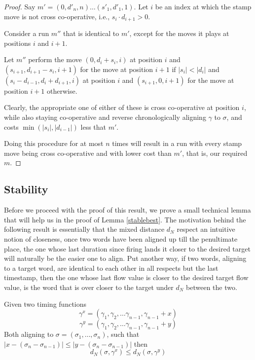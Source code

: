 \documentclass[runningheads]{llncs}
\begin{document}
\begin{proof}
Say $m' = (0, d'_n, n) \dots (s'_1, d'_1, 1)$. 
Let $i$ be an index at which the stamp move is not cross co-operative, i.e., $s_i \cdot d_{i+1} > 0$. 

Consider a run $m''$ that is identical to $m'$, except for the moves it plays at positions $i$ and $i+1$.   

Let $m''$ perform the move $(0, d_i + s_i, i)$ at position $i$ and $(s_{i+1}, d_{i+1} - s_{i}, i+1)$ for the move at position $i+1$ if $|s_i| < |d_i|$ and $(s_i - d_{i-1}, d_i + d_{i+1}, i)$ at position $i$ and $(s_{i+1}, 0, i+1)$ for the move at position $i+1$ otherwise. 

Clearly, the appropriate one of either of these is cross co-operative at position $i$, while also staying co-operative and reverse chronologically aligning $\gamma$ to $\sigma$, and costs $\min(|s_i|, |d_{i-1}|)$ less that $m'$. 

Doing this procedure for at most $n$ times will result in a run with every stamp move being cross co-operative and with lower cost than $m'$, that is, our required $m$. 
\end{proof}

\subsection{Stability} 
Before we proceed with the proof of this result, we prove a small technical lemma that will help us in the proof of Lemma \ref{stablebest}. The motivation behind the following result is essentially that the mixed distance $d_N$ respect an intuitive notion of closeness, once two words have been aligned up till the penultimate place, the one whose last duration since firing lands it closer to the desired target will naturally be the easier one to align. Put another way, if two words, aligning to a target word, are identical to each other in all respects but the last timestamp, then the one whose last flow value is closer to the desired target flow value, is the word that is over closer to the target under $d_N$ between the two. 

\begin{lemma}\label{cooplast}
Given two timing functions $$\gamma^x = (\gamma_1, \gamma_2, \dots \gamma_{n-1}, \gamma_{n-1} + x)$$ $$\gamma^y = (\gamma_1, \gamma_2, \dots \gamma_{n-1}, \gamma_{n-1} + y)$$ Both aligning to $\sigma = (\sigma_1, \dots, \sigma_n)$, such that $|x - (\sigma_n - \sigma_{n-1})| \leq |y - (\sigma_n - \sigma_{n-1})|$ then $$d_N(\sigma, \gamma^x) \leq d_N(\sigma, \gamma^y)$$ 
\end{lemma}
\end{document}
